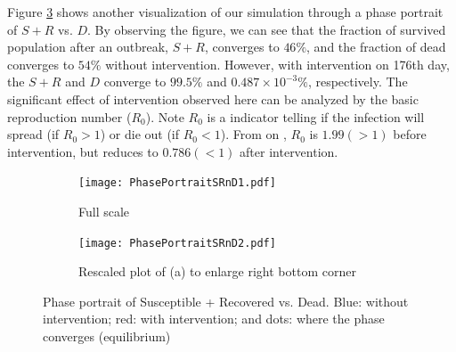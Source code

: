 %
%


%
%

Figure \ref{fig:PhasePortrait} shows another visualization of our simulation through a phase portrait of $S+R$ vs. $D$. By observing the figure, we can see that the fraction of survived population after an outbreak, $S+R$, converges to $46\%$, and the fraction of dead converges to $54\%$ without intervention. However, with intervention on 176th day, the $S+R$ and $D$ converge to $99.5\%$ and $0.487 \times10^{-3}\%$, respectively. The significant effect of intervention observed here can be analyzed by the basic reproduction number ($R_0$). Note $R_0$ is a indicator telling if the infection will spread (if $R_0>1$) or die out (if $R_0<1$). From on \cite{Legrand2007}, $R_0$ is $1.99 (>1)$ before intervention, but reduces to $0.786(<1)$ after intervention.


\begin{figure}[h!]
 \centering 
 \begin{subfigure}[b]{0.38\textwidth}
  \texttt{[image: PhasePortraitSRnD1.pdf]} \caption{Full scale} \label{fig:PhasePortraitA} \end{subfigure}
 \hspace{.1cm}
\begin{subfigure}[b]{0.38\textwidth}
 \texttt{[image: PhasePortraitSRnD2.pdf]} \caption{Rescaled plot of (a) to enlarge right bottom corner} \label{fiig:PhasePortraitB} \end{subfigure} 
\caption{Phase portrait of Susceptible + Recovered vs. Dead. Blue: without intervention; red: with intervention; and dots: where the phase converges (equilibrium)}
\label{fig:PhasePortrait} 
\end{figure}


\clearpage




